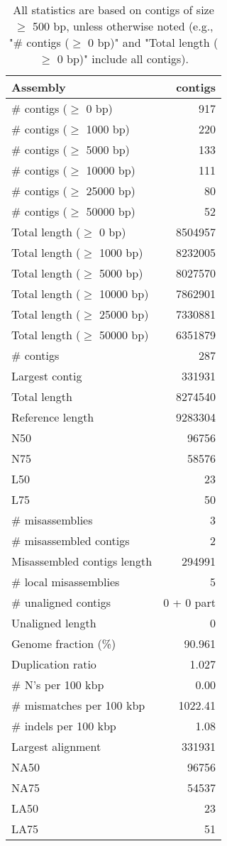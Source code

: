 \documentclass[12pt,a4paper]{article}
\begin{document}
\begin{table}[ht]
\begin{center}
\caption{All statistics are based on contigs of size $\geq$ 500 bp, unless otherwise noted (e.g., "\# contigs ($\geq$ 0 bp)" and "Total length ($\geq$ 0 bp)" include all contigs).}
\begin{tabular}{|l*{1}{|r}|}
\hline
Assembly & contigs \\ \hline
\# contigs ($\geq$ 0 bp) & 917 \\ \hline
\# contigs ($\geq$ 1000 bp) & 220 \\ \hline
\# contigs ($\geq$ 5000 bp) & 133 \\ \hline
\# contigs ($\geq$ 10000 bp) & 111 \\ \hline
\# contigs ($\geq$ 25000 bp) & 80 \\ \hline
\# contigs ($\geq$ 50000 bp) & 52 \\ \hline
Total length ($\geq$ 0 bp) & 8504957 \\ \hline
Total length ($\geq$ 1000 bp) & 8232005 \\ \hline
Total length ($\geq$ 5000 bp) & 8027570 \\ \hline
Total length ($\geq$ 10000 bp) & 7862901 \\ \hline
Total length ($\geq$ 25000 bp) & 7330881 \\ \hline
Total length ($\geq$ 50000 bp) & 6351879 \\ \hline
\# contigs & 287 \\ \hline
Largest contig & 331931 \\ \hline
Total length & 8274540 \\ \hline
Reference length & 9283304 \\ \hline
N50 & 96756 \\ \hline
N75 & 58576 \\ \hline
L50 & 23 \\ \hline
L75 & 50 \\ \hline
\# misassemblies & 3 \\ \hline
\# misassembled contigs & 2 \\ \hline
Misassembled contigs length & 294991 \\ \hline
\# local misassemblies & 5 \\ \hline
\# unaligned contigs & 0 + 0 part \\ \hline
Unaligned length & 0 \\ \hline
Genome fraction (\%) & 90.961 \\ \hline
Duplication ratio & 1.027 \\ \hline
\# N's per 100 kbp & 0.00 \\ \hline
\# mismatches per 100 kbp & 1022.41 \\ \hline
\# indels per 100 kbp & 1.08 \\ \hline
Largest alignment & 331931 \\ \hline
NA50 & 96756 \\ \hline
NA75 & 54537 \\ \hline
LA50 & 23 \\ \hline
LA75 & 51 \\ \hline
\end{tabular}
\end{center}
\end{table}
\end{document}
